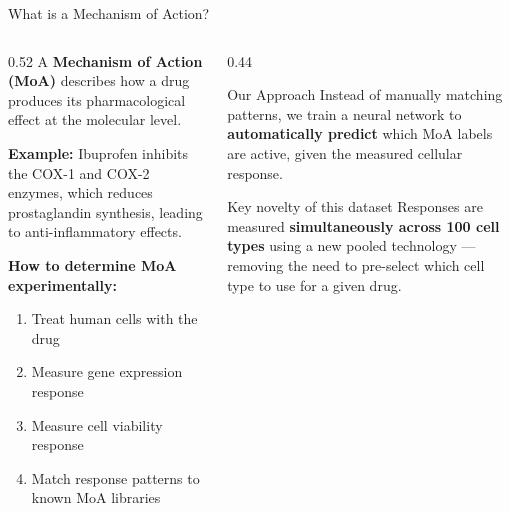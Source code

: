 \documentclass[aspectratio=169, 10pt]{beamer}
\begin{document}
\begin{frame}{What is a Mechanism of Action?}
  \begin{columns}[T]
    \begin{column}{0.52\textwidth}
      A \textbf{Mechanism of Action (MoA)} describes how a drug
      produces its pharmacological effect at the molecular level.
      \vspace{0.8em}

      \textbf{Example:} Ibuprofen inhibits the COX-1 and COX-2
      enzymes, which reduces prostaglandin synthesis,
      leading to anti-inflammatory effects.
      \vspace{0.8em}

      \textbf{How to determine MoA experimentally:}
      \begin{enumerate}
        \item Treat human cells with the drug
        \item Measure gene expression response
        \item Measure cell viability response
        \item Match response patterns to known MoA libraries
      \end{enumerate}
    \end{column}
    \begin{column}{0.44\textwidth}
      \begin{exampleblock}{Our Approach}
        Instead of manually matching patterns, we train a neural
        network to \textbf{automatically predict} which MoA labels
        are active, given the measured cellular response.
      \end{exampleblock}
      \vspace{0.6em}
      \begin{block}{Key novelty of this dataset}
        Responses are measured \textbf{simultaneously across
        100 cell types} using a new pooled technology —
        removing the need to pre-select which cell type
        to use for a given drug.
      \end{block}
    \end{column}
  \end{columns}
\end{frame}
\end{document}
